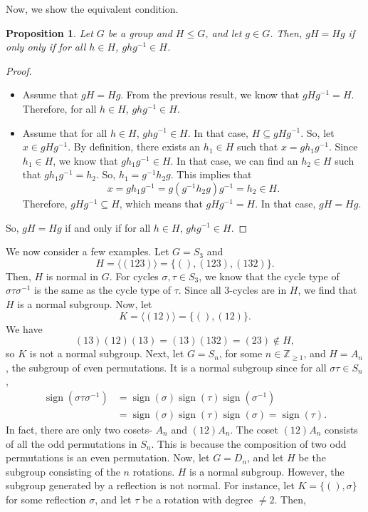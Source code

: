 \documentclass[a4paper, openany]{memoir}
\theoremstyle{definition}
\theoremstyle{plain}
\newtheorem{proposition}[definition]{Proposition}
\begin{document}
\noindent Now, we show the equivalent condition.
\begin{proposition}
Let $G$ be a group and $H \leqslant G$, and let $g \in G$. Then, $gH = Hg$ if only only if for all $h \in H$, $ghg^{-1} \in H$.
\end{proposition}
\begin{proof}
\hspace*{0pt}
\begin{itemize}
    \item Assume that $gH = Hg$. From the previous result, we know that $gHg^{-1} = H$. Therefore, for all $h \in H$, $ghg^{-1} \in H$.
    \item Assume that for all $h \in H$, $ghg^{-1} \in H$. In that case, $H \subseteq gHg^{-1}$. So, let $x \in gHg^{-1}$. By definition, there exists an $h_1 \in H$ such that $x = gh_1g^{-1}$. Since $h_1 \in H$, we know that $gh_1g^{-1} \in H$. In that case, we can find an $h_2 \in H$ such that $gh_1g^{-1} = h_2$. So, $h_1 = g^{-1}h_2g$. This implies that
    \[x = gh_1g^{-1} =  g(g^{-1}h_2g)g^{-1} = h_2 \in H.\]
    Therefore, $gHg^{-1} \subseteq H$, which means that $gHg^{-1} = H$. In that case, $gH = Hg$.
\end{itemize}
So, $gH = Hg$ if and only if for all $h \in H$, $ghg^{-1} \in H$.
\end{proof}
\noindent We now consider a few examples. Let $G = S_3$ and
\[H = \langle (123) \rangle = \{(), (123), (132)\}.\]
Then, $H$ is normal in $G$. For cycles $\sigma, \tau \in S_3$, we know that the cycle type of $\sigma \tau \sigma^{-1}$ is the same as the cycle type of $\tau$. Since all $3$-cycles are in $H$, we find that $H$ is a normal subgroup. Now, let
\[K = \langle (12) \rangle = \{(), (12)\}.\]
We have 
\[(13)(12)(13) = (13)(132) = (23) \not\in H,\]
so $K$ is not a normal subgroup. Next, let $G = S_n$, for some $n \in \mathbb{Z}_{\geqslant 1}$, and $H = A_n$, the subgroup of even permutations. It is a normal subgroup since for all $\sigma \tau \in S_n$,
\begin{align*}
    \operatorname{sign}(\sigma \tau \sigma^{-1}) &= \operatorname{sign}(\sigma) \operatorname{sign}(\tau) \operatorname{sign}(\sigma^{-1}) \\
    &= \operatorname{sign}(\sigma) \operatorname{sign}(\tau) \operatorname{sign}(\sigma) = \operatorname{sign}(\tau).
\end{align*}
In fact, there are only two cosets- $A_n$ and $(12) A_n$. The coset $(12) A_n$ consists of all the odd permutations in $S_n$. This is because the composition of two odd permutations is an even permutation. Now, let $G = D_n$, and let $H$ be the subgroup consisting of the $n$ rotations. $H$ is a normal subgroup. However, the subgroup generated by a reflection is not normal. For instance, let $K = \{(), \sigma\}$ for some reflection $\sigma$, and let $\tau$ be a rotation with degree $\neq 2$. Then, 
\end{document}
